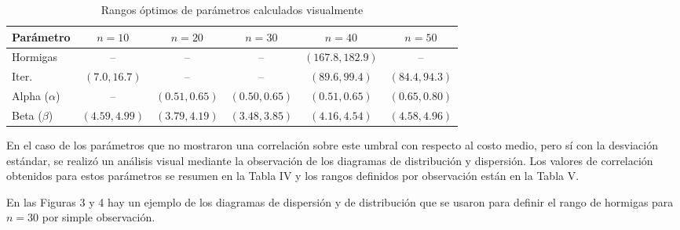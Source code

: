 \documentclass[conference]{IEEEtran}
\begin{document}
\begin{table}[h]
\centering
\setlength{\tabcolsep}{2pt}
\begin{tabular}{|l|c|c|c|c|c|}
\hline
Parámetro & $n=10$ & $n=20$ & $n=30$ & $n=40$ & $n=50$ \\
\hline
Hormigas & -- & -- & -- & $(167.8, 182.9)$ & -- \\
\hline
Iter. & $(7.0, 16.7)$ & -- & -- & $(89.6, 99.4)$ & $(84.4, 94.3)$ \\
\hline
Alpha ($\alpha$) & -- & $(0.51, 0.65)$ & $(0.50, 0.65)$ & $(0.51, 0.65)$ & $(0.65, 0.80)$ \\
\hline
Beta ($\beta$) & $(4.59, 4.99)$ & $(3.79, 4.19)$ & $(3.48, 3.85)$ & $(4.16, 4.54)$ & $(4.58, 4.96)$ \\
\hline
\end{tabular}
\caption{Rangos óptimos de parámetros calculados visualmente}
\label{tab:table2}
\end{table}

En el caso de los parámetros que no mostraron una correlación sobre este umbral con respecto al costo medio, pero sí con la desviación estándar, se realizó un análisis visual mediante la observación de los diagramas de distribución y dispersión. Los valores de correlación obtenidos para estos parámetros se resumen en la Tabla IV y los rangos definidos por observación están en la Tabla V.

\begin{table}[h]
  \centering
  \caption{Correlaciones de parámetros con la desviación estándar del costo}
  \label{tab:table1}
\end{table}

En las Figuras 3 y 4 hay un ejemplo de los diagramas de dispersión y de distribución que se usaron para definir el rango de hormigas para $n=30$ por simple observación.
\end{document}
